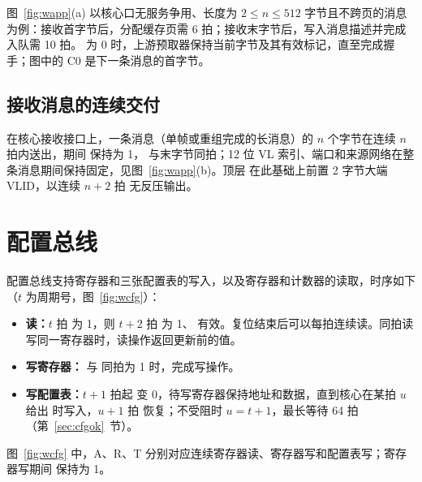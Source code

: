 图~\ref{fig:wapp}(a) 以核心口无服务争用、长度为 $2\le n\le512$ 字节且不跨页的消息为例：接收首字节后，分配缓存页需 6 拍；接收末字节后，写入消息描述并完成入队需 10 拍。 为 0 时，上游预取器保持当前字节及其有效标记，直至完成握手；图中的 C0 是下一条消息的首字节。

\subsection{接收消息的连续交付}

在核心接收接口上，一条消息（单帧或重组完成的长消息）的 $n$ 个字节在连续 $n$ 拍内送出，期间  保持为 1， 与末字节同拍；12 位 VL 索引、端口和来源网络在整条消息期间保持固定，见图~\ref{fig:wapp}(b)。顶层  在此基础上前置 2 字节大端 VLID，以连续 $n+2$ 拍  无反压输出。


\section{配置总线}

配置总线支持寄存器和三张配置表的写入，以及寄存器和计数器的读取，时序如下（$t$ 为周期号，图~\ref{fig:wcfg}）：
\begin{itemize}
  \item \textbf{读：}$t$ 拍  为 1，则 $t+2$ 拍  为 1、 有效。复位结束后可以每拍连续读。同拍读写同一寄存器时，读操作返回更新前的值。
  \item \textbf{写寄存器：} 与  同拍为 1 时，完成写操作。
  \item \textbf{写配置表：}$t+1$ 拍起  变 0，待写寄存器保持地址和数据，直到核心在某拍 $u$ 给出  时写入，$u+1$ 拍  恢复；不受阻时 $u=t+1$，最长等待 64 拍（第~\ref{sec:cfgok}~节）。
\end{itemize}

图~\ref{fig:wcfg} 中，A、R、T 分别对应连续寄存器读、寄存器写和配置表写；寄存器写期间  保持为 1。


